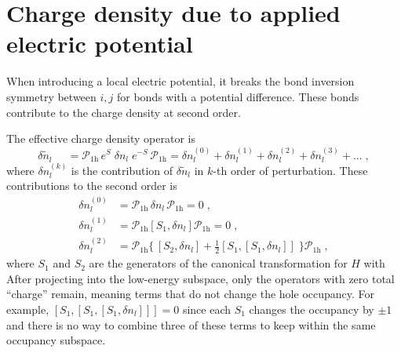 \section{Charge density due to applied electric potential}
\label{sec:micro-2nd}
When introducing a local electric potential, it breaks the bond inversion symmetry between $i,j$ for bonds with a potential difference. These bonds contribute to the charge density at second order.



The effective charge density operator is
\begin{equation}
        \delta \tilde{n}_l^{\phantom{(0)}}= \mathcal{P}_{1\text{h}} \, e^{S} \; \delta {n}_l \; e^{-S} \,  \mathcal{P}_{1\text{h}}
        = \delta n_l^{(0)} + \delta n_l^{(1)} + \delta n_l^{(2)} + \delta n_l^{(3)} + ...  \; ,
\end{equation}
where $\delta n_l^{(k)}$ is the contribution of $\delta \tilde{n}_l$ in $k$-th order of perturbation.
These contributions to the second order is
\begin{equation}
    \begin{split}
        \delta n_l^{(0)} &= \mathcal{P}_{1\text{h}} \, \delta {n}_l \,\mathcal{P}_{1\text{h}} = 0  \; , \\
         \delta n_l^{(1)} &= \mathcal{P}_{1\text{h}} [S_1, \delta {n}_l ] \mathcal{P}_{1\text{h}} = 0\; , \\
         \delta n_l^{(2)} &=  %
         \mathcal{P}_{1\text{h}} \Big\{\, [S_2, \delta {n}_l ]+  \frac{1}{2} [S_1,[S_1, \delta {n}_l ]] \; \Big\}  \mathcal{P}_{1\text{h}}  \; ,
    \end{split}
\end{equation}
where $S_1$ and $S_2$ are the generators of the canonical transformation for ${H}$ with
After projecting into the low-energy subspace, only the operators with zero total ``charge'' remain, meaning terms that do not change the hole occupancy. For example, $ [S_1,[S_1, [S_1, \delta {n}_l ]]] = 0$ since each $S_1$ changes the occupancy by $\pm 1$ and there is no way to combine three of these terms to keep within the same occupancy subspace.

